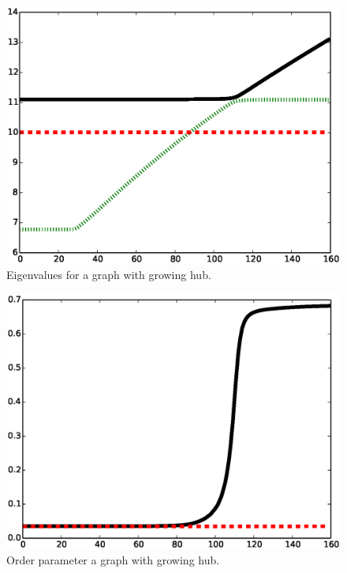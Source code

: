 \documentclass[twocolumn,prl,superscriptaddress]{revtex4}
\begin{document}
\cite{hashimoto89, nadakuditi13, krzakala13, chung03}

\begin{figure}
\begin{center}
\includegraphics[width=\columnwidth]{eig.eps}
\end{center}
\caption{Eigenvalues for a graph with growing hub.}
\label{fig:evalues}
\end{figure}


\begin{figure}
\begin{center}
\includegraphics[width=\columnwidth]{op.eps}
\end{center}
\caption{Order parameter a graph with growing hub.}
\label{fig:order-parameter}
\end{figure}
\end{document}
